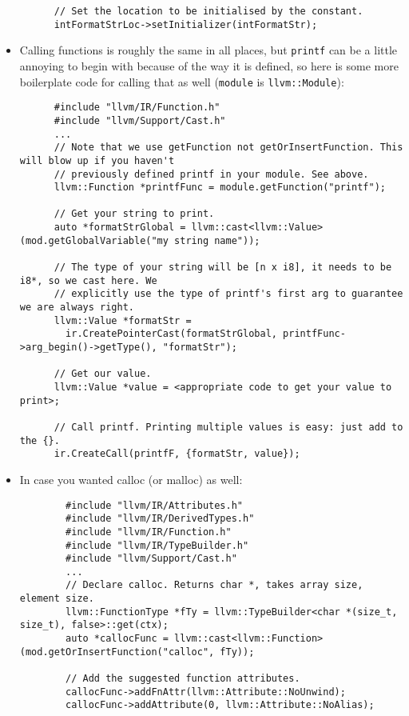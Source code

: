 \documentclass{article}
\newcommand{\code}[1]{\texttt{\textmd{#1}}}
\begin{document}
\begin{itemize}
\begin{lstlisting}
      // Set the location to be initialised by the constant.
      intFormatStrLoc->setInitializer(intFormatStr);
    \end{lstlisting}
  \item
    Calling functions is roughly the same in all places, but \code{printf} can be a little annoying
    to begin with because of the way it is defined, so here is some more boilerplate code for
    calling that as well (\code{module} is \code{llvm::Module}):
    \begin{lstlisting}
      #include "llvm/IR/Function.h"
      #include "llvm/Support/Cast.h"
      ...
      // Note that we use getFunction not getOrInsertFunction. This will blow up if you haven't
      // previously defined printf in your module. See above.
      llvm::Function *printfFunc = module.getFunction("printf");

      // Get your string to print.
      auto *formatStrGlobal = llvm::cast<llvm::Value>(mod.getGlobalVariable("my string name"));

      // The type of your string will be [n x i8], it needs to be i8*, so we cast here. We
      // explicitly use the type of printf's first arg to guarantee we are always right.
      llvm::Value *formatStr =
        ir.CreatePointerCast(formatStrGlobal, printfFunc->arg_begin()->getType(), "formatStr");

      // Get our value.
      llvm::Value *value = <appropriate code to get your value to print>;

      // Call printf. Printing multiple values is easy: just add to the {}.
      ir.CreateCall(printfF, {formatStr, value});
    \end{lstlisting}
  \item
    In case you wanted calloc (or malloc) as well:
    \begin{lstlisting}
        #include "llvm/IR/Attributes.h"
        #include "llvm/IR/DerivedTypes.h"
        #include "llvm/IR/Function.h"
        #include "llvm/IR/TypeBuilder.h"
        #include "llvm/Support/Cast.h"
        ...
        // Declare calloc. Returns char *, takes array size, element size.
        llvm::FunctionType *fTy = llvm::TypeBuilder<char *(size_t, size_t), false>::get(ctx);
        auto *callocFunc = llvm::cast<llvm::Function>(mod.getOrInsertFunction("calloc", fTy));

        // Add the suggested function attributes.
        callocFunc->addFnAttr(llvm::Attribute::NoUnwind);
        callocFunc->addAttribute(0, llvm::Attribute::NoAlias);
    \end{lstlisting}
\end{itemize}
\end{document}
